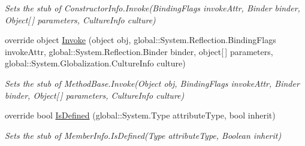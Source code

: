 \begin{DoxyCompactItemize}
\begin{DoxyCompactList}\small\item\em Sets the stub of Constructor\-Info.\-Invoke(\-Binding\-Flags invoke\-Attr, Binder binder, Object\mbox{[}$\,$\mbox{]} parameters, Culture\-Info culture)\end{DoxyCompactList}\item 
override object \hyperlink{class_system_1_1_reflection_1_1_fakes_1_1_stub_constructor_info_ac3c3425a8eb1000b029bf596d4dbd473}{Invoke} (object obj, global\-::\-System.\-Reflection.\-Binding\-Flags invoke\-Attr, global\-::\-System.\-Reflection.\-Binder binder, object\mbox{[}$\,$\mbox{]} parameters, global\-::\-System.\-Globalization.\-Culture\-Info culture)
\begin{DoxyCompactList}\small\item\em Sets the stub of Method\-Base.\-Invoke(\-Object obj, Binding\-Flags invoke\-Attr, Binder binder, Object\mbox{[}$\,$\mbox{]} parameters, Culture\-Info culture)\end{DoxyCompactList}\item 
override bool \hyperlink{class_system_1_1_reflection_1_1_fakes_1_1_stub_constructor_info_abdb1286ddee7d0a61268746571d0542c}{Is\-Defined} (global\-::\-System.\-Type attribute\-Type, bool inherit)
\begin{DoxyCompactList}\small\item\em Sets the stub of Member\-Info.\-Is\-Defined(\-Type attribute\-Type, Boolean inherit)\end{DoxyCompactList}\end{DoxyCompactItemize}
